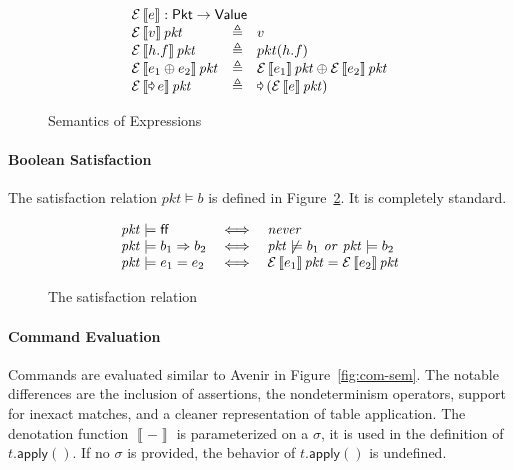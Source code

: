 \documentclass{article}
\newcommand{\pkt}{\mathit{pkt}}
\newcommand{\denote}[1]{\left\llbracket#1\right\rrbracket}
\newcommand{\edenote}[1]{\mathcal{E}\denote{#1}}
\newcommand{\FALSE}{\mathsf{ff}}
\newcommand{\binop}{\mathbin{\oplus}}
\newcommand{\unop}{\mathop{\text{\pointer}}}
\newcommand{\Value}{\mathsf{Value}}
\newcommand{\Pkt}{\mathsf{Pkt}}
\newcommand{\matches}{\mathsf{matches}}
\newcommand{\action}{\mathsf{action}}
\newcommand{\data}{\mathsf{data}}
\newcommand{\apply}{\mathsf{apply}}
\theoremstyle{plain}
\theoremstyle{definition}
\theoremstyle{remark}
\begin{document}
\begin{figure}[H]
  \[\begin{array}{l>{\triangleq}cl}
  \multicolumn{3}{l}{\edenote{e} : \Pkt \to \Value }\\
    \edenote{v}\pkt &&
    v \\
    \edenote{h.f}\pkt &&
    pkt(h.f)\\
    \edenote{e_1 \binop e_2}\pkt&&
    \edenote{e_1}\pkt \binop
    \edenote{e_2}\pkt \\
    \edenote{\unop e}\pkt &&
    \unop \left(\edenote{e}\pkt\right)
  \end{array}
  \]
  \caption{Semantics of Expressions}
  \label{fig:sem-expr}
\end{figure}

\paragraph{Boolean Satisfaction}
The satisfaction relation $\pkt \models b$ is defined in
Figure~\ref{fig:bool-satis}. It is completely standard.

\begin{figure}
  \[
  \begin{array}{l >{\iff}c l}
    \pkt \models \FALSE
    && \mathit{never}\\
    \pkt \models b_1 \Rightarrow b_2
    && \pkt \not\models b_1~\mathit{or}~\pkt \models b_2\\
    \pkt \models e_1 = e_2
    && \edenote{e_1}\pkt = \edenote{e_2}\pkt\\

  \end{array}
  \]
  \caption{The satisfaction relation}
  \label{fig:bool-satis}
\end{figure}


\paragraph{Command Evaluation}
Commands are evaluated similar to Avenir in Figure~\ref{fig:com-sem}. The
notable differences are the inclusion of assertions, the nondeterminism
operators, support for inexact matches, and a cleaner representation of table
application. The denotation function $\denote{-}$ is parameterized on a
$\sigma$, it is used in the definition of $t.\apply()$. If no $\sigma$ is
provided, the behavior of $t.\apply()$ is undefined.
\end{document}
